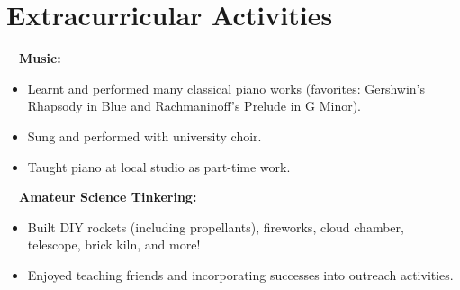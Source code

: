 \documentclass[11pt]{article}
\begin{document}
\section{Extracurricular Activities}
\-\ \-\ \textbf{Music:}
\begin{itemize}[noitemsep]
      \item Learnt and performed many classical piano works (favorites: Gershwin's Rhapsody in Blue and Rachmaninoff's Prelude in G Minor).
      \item Sung and performed with university choir.
      \item Taught piano at local studio as part-time work.
\end{itemize}
\-\ \-\ \textbf{Amateur Science Tinkering:}
\begin{itemize}[noitemsep]
      \item Built DIY rockets (including propellants), fireworks, cloud chamber, telescope, brick kiln, and more!
      \item Enjoyed teaching friends and incorporating successes into outreach activities.
\end{itemize}
\end{document}
